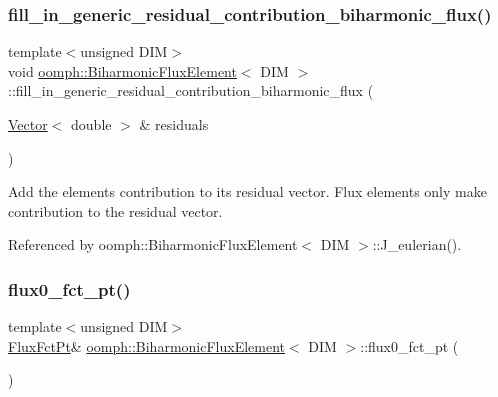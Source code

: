 \subsubsection{\texorpdfstring{fill\+\_\+in\+\_\+generic\+\_\+residual\+\_\+contribution\+\_\+biharmonic\+\_\+flux()}{fill\_in\_generic\_residual\_contribution\_biharmonic\_flux()}\hspace{0.1cm}{\footnotesize\ttfamily [2/2]}}
{\footnotesize\ttfamily template$<$unsigned D\+IM$>$ \\
void \hyperlink{classoomph_1_1BiharmonicFluxElement}{oomph\+::\+Biharmonic\+Flux\+Element}$<$ D\+IM $>$\+::fill\+\_\+in\+\_\+generic\+\_\+residual\+\_\+contribution\+\_\+biharmonic\+\_\+flux (\begin{DoxyParamCaption}\item[{\hyperlink{classoomph_1_1Vector}{Vector}$<$ double $>$ \&}]{residuals }\end{DoxyParamCaption})\hspace{0.3cm}{\ttfamily [private]}}



Add the element\textquotesingle{}s contribution to its residual vector. Flux elements only make contribution to the residual vector. 



Referenced by oomph\+::\+Biharmonic\+Flux\+Element$<$ D\+I\+M $>$\+::\+J\+\_\+eulerian().

\mbox{\label{classoomph_1_1BiharmonicFluxElement_a15b9cb28dcbe2d192cc5c6041ec31f0f}} 
\subsubsection{\texorpdfstring{flux0\+\_\+fct\+\_\+pt()}{flux0\_fct\_pt()}}
{\footnotesize\ttfamily template$<$unsigned D\+IM$>$ \\
\hyperlink{classoomph_1_1BiharmonicFluxElement_a0fafeac48951b37cf5cd86aa486945a8}{Flux\+Fct\+Pt}\& \hyperlink{classoomph_1_1BiharmonicFluxElement}{oomph\+::\+Biharmonic\+Flux\+Element}$<$ D\+IM $>$\+::flux0\+\_\+fct\+\_\+pt (\begin{DoxyParamCaption}{ }\end{DoxyParamCaption})\hspace{0.3cm}{\ttfamily [inline]}}



